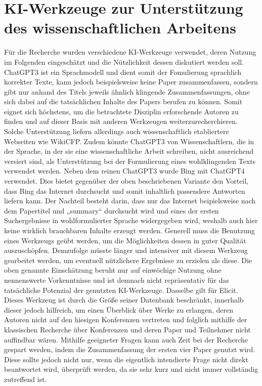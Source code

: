 \documentclass[12pt]{report}
\begin{document}

\chapter{KI-Werkzeuge zur Unterstützung des wissenschaftlichen Arbeitens}
Für die Recherche wurden verschiedene KI-Werkzeuge verwendet, deren Nutzung im Folgenden eingeschätzt und die Nützlichkeit dessen diskutiert werden soll. 
ChatGPT3 ist ein Sprachmodell und dient somit der Fomulierung sprachlich korrekter Texte, kann jedoch beispielsweise keine Paper zusammenfassen, sondern gibt nur anhand des Titels jeweils ähnlich klingende Zusammenfassungen, ohne sich dabei auf die tatsächlichen Inhalte des Papers berufen zu können. Somit eignet sich höchstens, um die betrachtete Disziplin erforschende Autoren zu finden und auf dieser Basis mit anderen Werkzeugen weiterzurecherchieren. Solche Unterstützung liefern allerdings auch wissenschaftlich
etabliertere Webseiten wie WikiCFP. Zudem könnte ChatGPT3 von Wissenschaftlern, die in der Sprache, in der sie eine wissenschaftliche Arbeit schreiben, nicht ausreichend versiert sind, als Unterstützung bei der Formulierung eines wohlklingenden Texts verwendet werden.
Neben dem reinen ChatGPT3 wurde Bing mit ChatGPT4 verwendet. Dies bietet gegenüber der oben beschriebenen Variante den Vorteil, dass Bing das Internet durchsucht und somit inhaltlich passendere Antworten liefern kann. Der Nachteil besteht darin, dass nur das Internet beipielsweise nach dem Papertitel und „summary“ durchsucht wird und eines der ersten Suchergebnisse in wohlformulierter Sprache widergegeben wird, weshalb auch hier keine wirklich brauchbaren Inhalte erzeugt werden.
Generell muss die Benutzung eines Werkzeugs geübt werden, um die Möglichkeiten dessen in guter Qualität auszuschöpfen. Demzufolge  müsste länger und intensiver mit diesem Werkzeug gearbeitet werden, um eventuell nützlichere Ergebnisse zu erzielen als diese. Die oben genannte Einschätzung beruht nur auf einwöchige Nutzung ohne nennenswerte Vorkenntnisse und ist demnach nicht repräsentativ für das tatsächliche Potenzial der genutzten KI-Werkzeuge.
Dasselbe gilt für Elicit. Dieses Werkzeug ist durch die Größe seiner Datenbank beschränkt, innerhalb dieser jedoch hilfreich, um einen Überblick über Werke zu erlangen, deren Autoren nicht auf den hiesigen Konferenzen vertreten und folglich mithilfe der klassischen Recherche über Konferenzen und deren Paper und Teilnehmer nicht auffindbar wären. Mithilfe geeigneter Fragen kann auch Zeit bei der Recherche gespart werden, indem die Zusammenfassung der ersten vier Paper genutzt wird. Diese sollte jedoch nicht nur, wenn die eigentlich intendierte Frage nicht direkt beantwortet wird, überprüft werden, da sie sehr kurz und nicht immer vollständig zutreffend ist.



\end{document}
